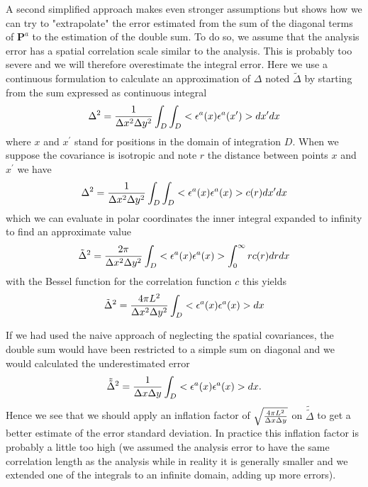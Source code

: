 A second simplified approach makes even stronger assumptions but shows how we can try to "extrapolate" the error estimated from the sum of the diagonal terms of $\mathbf{P}^a$ to the estimation of the double sum. To do so, we assume that the analysis error has a spatial correlation scale similar to the analysis.
This is probably too severe and we will therefore overestimate the integral error. 
Here we use a continuous formulation to calculate an approximation of $\Delta$ noted $\tilde{\Delta}$ by starting from the sum expressed as continuous integral
\begin{equation}
{\Delta}^2= {1 \over \Delta x^2 \Delta y^2} \int_D \int_D <{\epsilon}^a(x) {\epsilon}^a(x^\prime)> d x^\prime d x 
\end{equation}
where $x$ and $x^\prime$ stand for positions in the domain of integration $D$. When we suppose the covariance is isotropic and note $r$ the distance between points
$x$ and $x^\prime$ we have 
\begin{equation}
{\Delta}^2= {1 \over \Delta x^2 \Delta y^2} \int_D \int_D <{\epsilon}^a(x) {\epsilon}^a(x) > c(r) d x^\prime d x  
\end{equation}
which we can evaluate in polar coordinates the inner integral expanded to infinity to find an approximate value
\begin{equation}
\tilde{\Delta}^2= {2 \pi \over \Delta x^2 \Delta y^2} \int_D <{\epsilon}^a(x) {\epsilon}^a(x) > \int_0^{\infty}  r c(r) d r d x
\end{equation}
with the Bessel function for the correlation function $c$ this yields
\begin{equation}
\tilde{\Delta}^2= {4 \pi L^2 \over \Delta x^2 \Delta y^2} \int_D <{\epsilon}^a(x) {\epsilon}^a(x) >  d x
\end{equation}

If we had used the naive approach of neglecting the spatial covariances, the double sum would have been restricted to a simple sum on diagonal and we would calculated the underestimated error 
\begin{equation}
\tilde{\tilde{\Delta}}^2= {1 \over \Delta x \Delta y} \int_D <{\epsilon}^a(x) {\epsilon}^a(x) >  d x.
\end{equation}
Hence we see that we should apply an inflation factor of $\sqrt{{4 \pi L^2 \over \Delta x \Delta y}}$ on $\tilde{\tilde{\Delta}}$ to get a better estimate of the error standard deviation. In practice  this inflation factor is probably a little too high (we assumed the analysis error to have the same correlation length as the analysis while in reality it is generally smaller and we extended one of the integrals to an infinite domain, adding up more errors).


